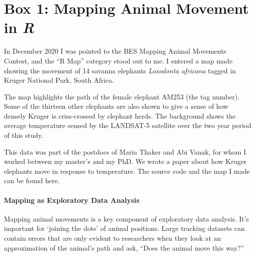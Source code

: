 
\pagestyle{plain}
\pagecolor{Snow2}

	\medskip
	\section*{Box 1: Mapping Animal Movement in \textit{R}}\label{box:mapping}

	In December 2020 I was pointed to the BES Mapping Animal Movements Contest, and the “R Map” category stood out to me. I entered a map made showing the movement of 14 savanna elephants \textit{Loxodonta africana} tagged in Kruger National Park, South Africa.


	The map highlights the path of the female elephant AM253 (the tag number). Some of the thirteen other elephants are also shown to give a sense of how densely Kruger is criss-crossed by elephant herds. The background shows the average temperature sensed by the LANDSAT-5 satellite over the two year period of this study.

	This data was part of the postdocs of Maria Thaker and Abi Vanak, for whom I worked between my master's and my PhD. We wrote a paper about how Kruger elephants move in response to temperature. The source code and the map I made can be found here.

	\paragraph*{Mapping as Exploratory Data Analysis}

	Mapping animal movements is a key component of exploratory data analysis. It's important for `joining the dots' of animal positions. Large tracking datasets can contain errors that are only evident to researchers when they look at an approximation of the animal's path and ask, “Does the animal move this way?”

